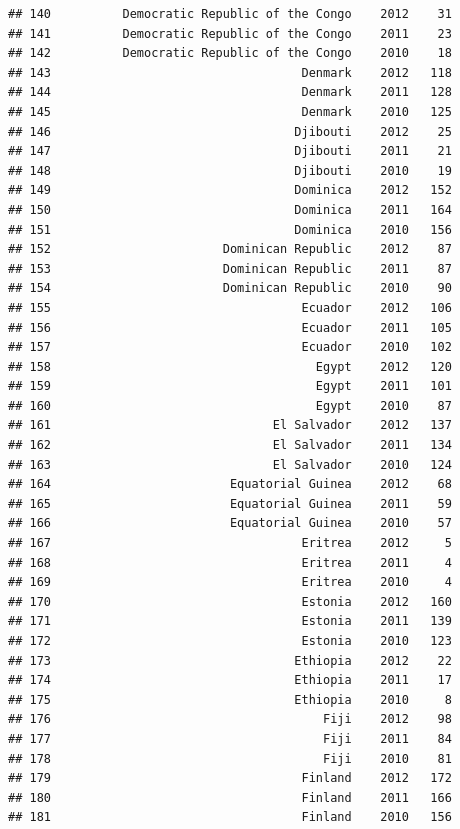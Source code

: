 \documentclass[
]{book}
\begin{document}
\begin{verbatim}
## 140          Democratic Republic of the Congo    2012    31
## 141          Democratic Republic of the Congo    2011    23
## 142          Democratic Republic of the Congo    2010    18
## 143                                   Denmark    2012   118
## 144                                   Denmark    2011   128
## 145                                   Denmark    2010   125
## 146                                  Djibouti    2012    25
## 147                                  Djibouti    2011    21
## 148                                  Djibouti    2010    19
## 149                                  Dominica    2012   152
## 150                                  Dominica    2011   164
## 151                                  Dominica    2010   156
## 152                        Dominican Republic    2012    87
## 153                        Dominican Republic    2011    87
## 154                        Dominican Republic    2010    90
## 155                                   Ecuador    2012   106
## 156                                   Ecuador    2011   105
## 157                                   Ecuador    2010   102
## 158                                     Egypt    2012   120
## 159                                     Egypt    2011   101
## 160                                     Egypt    2010    87
## 161                               El Salvador    2012   137
## 162                               El Salvador    2011   134
## 163                               El Salvador    2010   124
## 164                         Equatorial Guinea    2012    68
## 165                         Equatorial Guinea    2011    59
## 166                         Equatorial Guinea    2010    57
## 167                                   Eritrea    2012     5
## 168                                   Eritrea    2011     4
## 169                                   Eritrea    2010     4
## 170                                   Estonia    2012   160
## 171                                   Estonia    2011   139
## 172                                   Estonia    2010   123
## 173                                  Ethiopia    2012    22
## 174                                  Ethiopia    2011    17
## 175                                  Ethiopia    2010     8
## 176                                      Fiji    2012    98
## 177                                      Fiji    2011    84
## 178                                      Fiji    2010    81
## 179                                   Finland    2012   172
## 180                                   Finland    2011   166
## 181                                   Finland    2010   156

\end{verbatim}
\end{document}
